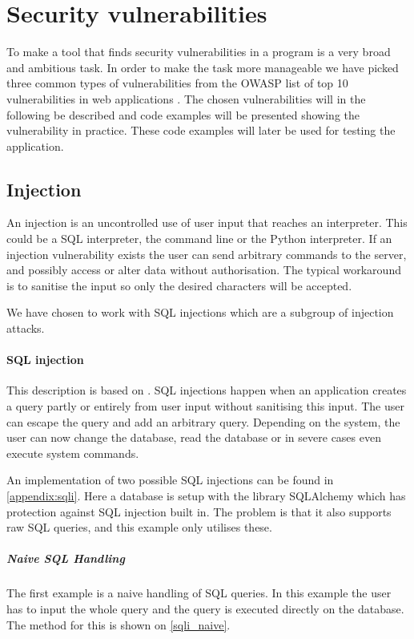 \section{Security vulnerabilities}\label{security_vulnerabilities}

To make a tool that finds security vulnerabilities in a program is a very broad and ambitious task.
In order to make the task more manageable we have picked three common types of vulnerabilities from the OWASP list of top 10 vulnerabilities in web applications \cite{OWASP10}.
The chosen vulnerabilities will in the following be described and code examples will be presented showing the vulnerability in practice.
These code examples will later be used for testing the application.

\subsection{Injection}\label{vulnerabilities:injection}
An injection is an uncontrolled use of user input that reaches an interpreter.
This could be a SQL interpreter, the command line or the Python interpreter.
If an injection vulnerability exists the user can  send arbitrary commands to the server, and possibly access or alter data without authorisation.
The typical workaround is to sanitise the input so only the desired characters will be accepted. \citep{OWASPTOP10PDF}

We have chosen to work with SQL injections which are a subgroup of injection attacks.

\paragraph{SQL injection}
This description is based on \citet{sqlinjection}.
SQL injections happen when an application creates a query partly or entirely from user input without sanitising this input.
The user can escape the query and add an arbitrary query.
Depending on the system, the user can now change the database, read the database or in severe cases even execute system commands.

An implementation of two possible SQL injections can be found in \cref{appendix:sqli}.
Here a database is setup with the library SQLAlchemy which has protection against SQL injection built in.
The problem is that it also supports raw SQL queries, and this example only utilises these.

\subparagraph{Naive SQL Handling}
The first example is a naive handling of SQL queries.
In this example the user has to input the whole query and the query is executed directly on the database.
The method for this is shown on \cref{sqli_naive}.

